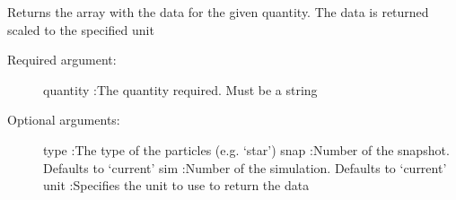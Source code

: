 \documentclass[letterpaper,10pt,english]{sphinxmanual}
\begin{document}

\begin{fulllineitems}
\label{index:facade.get_data}
Returns the array with the data for the given quantity.
The data is returned scaled to the specified unit
\begin{description}
\item[{Required argument:}] \leavevmode
quantity        :The quantity required. Must be a string

\item[{Optional arguments:}] \leavevmode
type            :The type of the particles (e.g. `star')
snap            :Number of the snapshot. Defaults to `current'
sim             :Number of the simulation. Defaults to `current'
unit            :Specifies the unit to use to return the data

\end{description}

\end{fulllineitems}

\end{document}
